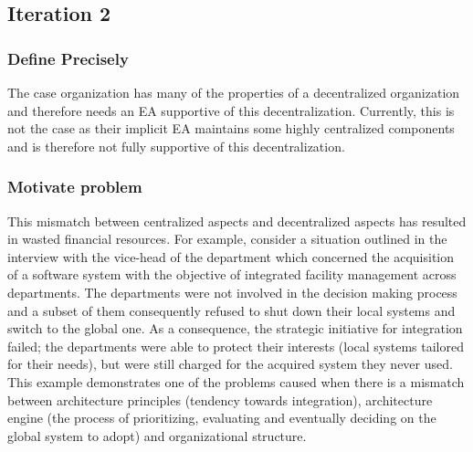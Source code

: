 



\subsection{Iteration 2}
\label{sec:explicate_iteration2}

\subsubsection*{Define Precisely}


The case organization has many of the properties of a decentralized organization and therefore needs an EA supportive of this decentralization. Currently, this is not the case as their implicit EA maintains some highly centralized components and is therefore not fully supportive of this decentralization. 


\subsubsection*{Motivate problem}


This mismatch between centralized aspects and decentralized aspects has resulted in wasted financial resources. For example, consider a situation outlined in the interview with the vice-head of the department which concerned the acquisition of a software system with the objective of integrated facility management across departments. The departments were not involved in the decision making process and a subset of them consequently refused to shut down their local systems and switch to the global one. As a consequence, the strategic initiative for integration failed; the departments were able to protect their interests (local systems tailored for their needs), but were still charged for the acquired system they never used. This example demonstrates one of the problems caused when there is a mismatch between architecture principles (tendency towards integration), architecture engine (the process of prioritizing, evaluating and eventually deciding on the global system to adopt) and organizational structure.

